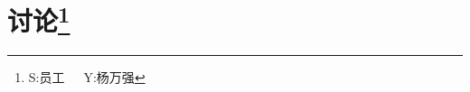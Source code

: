 \documentclass[11pt]{article}
\begin{document}
\begin{comment}
谢谢你的心得。我看过之后,不得不提一下我的意见。
\begin{enumerate}
  \item 你说:``临时被叫去开会,培训并没有听完,。。。''

    这代表了,你在接受培训和交流的过程之中,已经损失了其中一部分的作用和效果了。 我们现在还不知道,或是还
    不承认、接受,这样同时进行做好几件事的情况,是低效的行为。 你的学习受到打击。其他的事情也未必可以专心
    做好。 这是我们不能提高执行力的很主要的原因。

  \item 你的疑惑:``只改进这两部分能达到整体最优吗?''

    IPD的作用,当然是要``整体最优''。这个观察非常对。所以我对公司的文化、氛围、方法、重点,都有很多的批
    评,因为这些批评,是我作为过程改进顾问的职责份内的事。 但是我不会觉得现在单单关注其中的两个部分,是让
    我疑惑的事。因为,这样做我们虽然未必可以做到``整体最优'',但是我们可以提高研发和产品管理的能力,可以
    做到这个已经非常非常不错了。将来的改进需要,努力,困难,都会因此而减少了。你说是么?

    所以``只包括市场营销和产品开发两个部分,还是有必要实施IPD的。'' 千万不要给自己任何借口,不去努力改进!

  \item 你的问题:``我们要改进什么?''你说的:``其他由于我所学甚少,也就不谈及了。''

   这个的确是我们问题的核心。

   我可以非常严肃地说:``我们需要改的,通过所有这些TL9000, CMMI, 6sigma, IPD, 等等,都是要改变我们自
   己,和自己份内的行为!''我们只能考虑如何把研发和产品做的更好。 我们不能判断领导强调研发和产品,是否最
   佳的方向。你现在可以考虑这个问题,但不能因此而放弃你现在的职责,万万不能,``其他由于我所学甚少,也就不
   谈及了。''参加培训就是要学呀!现在需要你把目前的任务做好,做的有效,其中包括学习好你岗位份内的事,你的
   努力,有了成就,才可能把你推举成为领导,之后,你就需要解决这个怎样推动过程改进的问题了。
\end{enumerate}

我读了你的心得,也有一个疑惑,你为什么不为``所学甚少''而苦恼呢? 你不觉得花了时间来听了培训,没有什么收
获,只是产生了一些疑惑,时间是花的不值得么?

你是否认识到一心二用是低效的呢?要专心把眼前的每一件事做好,才是提高效力的基本基础。 只有这样,才能建立执
行力。

谢谢你的支持和努力。
\end{comment}

\pagebreak
\section{讨论\footnote{\textsf{S:员工~~~Y:杨万强}}}
\end{document}
